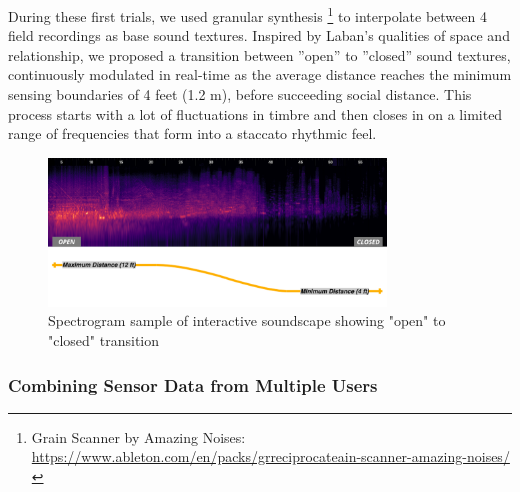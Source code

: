 During these first trials, we used granular synthesis \footnote{{Grain Scanner
by Amazing Noises: \url{https://www.ableton.com/en/packs/grreciprocateain-scanner-amazing-noises/}}} to interpolate between 4 field recordings as base sound textures. Inspired by Laban’s qualities of space and relationship, we proposed a transition between ”open” to ”closed” sound textures, continuously modulated in real-time as the average distance reaches the minimum sensing boundaries of 4 feet (1.2 m), before succeeding social distance. This process starts with a lot of fluctuations in timbre and then closes in on a limited range of frequencies that form into a staccato rhythmic feel.

\begin{figure}[!h]
\captionsetup{width=1.0\textwidth}
\centering
\includegraphics[width=0.8\textwidth,keepaspectratio]{Chapters/Figures/adse_ess/open_closed_examples_annotated_landscape_line_cont.png}
{\caption[Spectrogram sample of interactive soundscape]{Spectrogram sample of interactive soundscape showing "open" to "closed" transition}\label{fig:sound_examples}}
\end{figure}

\subsubsection{Combining Sensor Data from Multiple Users}

